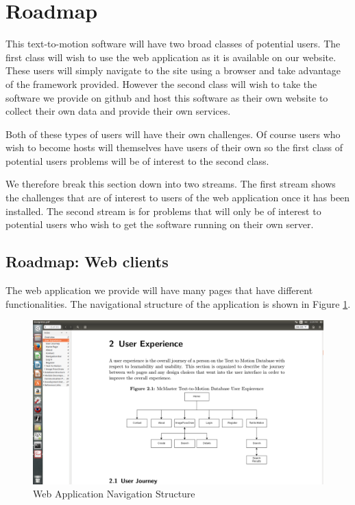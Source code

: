 \documentclass{scrreprt}
\begin{document}
\section{Roadmap}

This text-to-motion software will have two broad classes of potential users.  The first class will wish to use the web application as it is available on our website.  These users will simply navigate to the site using a browser and take advantage of the framework provided. However the second class will wish to take the software we provide on github and host this software as their own website to collect their own data and provide their own services.

Both of these types of users will have their own challenges.  Of course users who wish to become hosts will themselves have users of their own so the first class of potential users problems will be of interest to the second class.  

We therefore break this section down into two streams.  The first stream shows the challenges that are of interest to users of the web application once it has been installed.  The second stream is for problems that will only be of interest to potential users who wish to get the software running on their own server.

\subsection{Roadmap: Web clients}

The web application we provide will have many pages that have different functionalities.  The navigational structure of the application is shown in Figure \ref{fig:navStruct}.

\begin{figure}
  \includegraphics[width=\linewidth]{apppicture.png}
  \caption{Web Application Navigation Structure}
  \label{fig:navStruct}
\end{figure}
\end{document}
